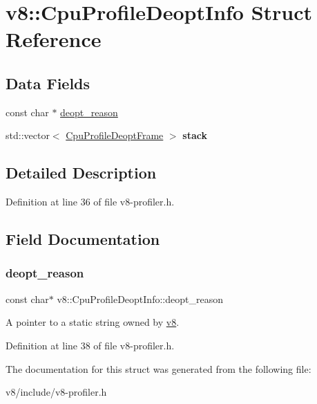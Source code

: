 \hypertarget{structv8_1_1CpuProfileDeoptInfo}{}\section{v8\+:\+:Cpu\+Profile\+Deopt\+Info Struct Reference}
\label{structv8_1_1CpuProfileDeoptInfo}
\subsection*{Data Fields}
\begin{DoxyCompactItemize}
\item 
const char $\ast$ \mbox{\hyperlink{structv8_1_1CpuProfileDeoptInfo_a908eb3ba33b47ace8973eeb2fda96ca9}{deopt\+\_\+reason}}
\item 
\mbox{\label{structv8_1_1CpuProfileDeoptInfo_a9446493c0e0a00e3ada02ba8df858d42}} 
std\+::vector$<$ \mbox{\hyperlink{structv8_1_1CpuProfileDeoptFrame}{Cpu\+Profile\+Deopt\+Frame}} $>$ {\bfseries stack}
\end{DoxyCompactItemize}


\subsection{Detailed Description}


Definition at line 36 of file v8-\/profiler.\+h.



\subsection{Field Documentation}
\mbox{\label{structv8_1_1CpuProfileDeoptInfo_a908eb3ba33b47ace8973eeb2fda96ca9}} 
\subsubsection{\texorpdfstring{deopt\+\_\+reason}{deopt\_reason}}
{\footnotesize\ttfamily const char$\ast$ v8\+::\+Cpu\+Profile\+Deopt\+Info\+::deopt\+\_\+reason}

A pointer to a static string owned by \mbox{\hyperlink{namespacev8}{v8}}. 

Definition at line 38 of file v8-\/profiler.\+h.



The documentation for this struct was generated from the following file\+:\begin{DoxyCompactItemize}
\item 
v8/include/v8-\/profiler.\+h\end{DoxyCompactItemize}
